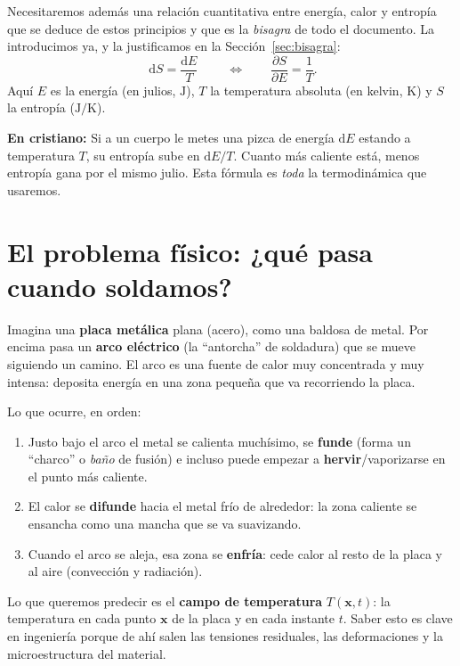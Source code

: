 \documentclass[11pt]{article}
\newcommand{\dd}{\mathrm{d}}
\theoremstyle{definition}
\theoremstyle{plain}
\newcommand{\dummies}[1]{%
  \par\smallskip\noindent
  \colorbox{yellow!18}{\parbox{\dimexpr\linewidth-2\fboxsep}{%
  \small\textbf{En cristiano:} #1}}\par\smallskip}
\begin{document}
Necesitaremos además una relación cuantitativa entre energía, calor y entropía que
se deduce de estos principios y que es la \emph{bisagra} de todo el documento. La
introducimos ya, y la justificamos en la Sección~\ref{sec:bisagra}:
\begin{equation}
  \boxed{\;\dd S = \frac{\dd E}{T}\;}
  \qquad\Longleftrightarrow\qquad
  \frac{\partial S}{\partial E} = \frac{1}{T}.
  \label{eq:bisagra}
\end{equation}
Aquí $E$ es la energía (en julios, $\mathrm{J}$), $T$ la temperatura absoluta (en
kelvin, $\mathrm{K}$) y $S$ la entropía ($\mathrm{J/K}$).

\dummies{Si a un cuerpo le metes una pizca de energía $\dd E$ estando a temperatura
$T$, su entropía sube en $\dd E/T$. Cuanto más caliente está, menos entropía gana
por el mismo julio. Esta fórmula es \emph{toda} la termodinámica que usaremos.}

\section{El problema físico: ¿qué pasa cuando soldamos?}
\label{sec:soldadura}

Imagina una \textbf{placa metálica} plana (acero), como una baldosa de metal.
Por encima pasa un \textbf{arco eléctrico} (la ``antorcha'' de soldadura) que se
mueve siguiendo un camino. El arco es una fuente de calor muy concentrada y muy
intensa: deposita energía en una zona pequeña que va recorriendo la placa.

Lo que ocurre, en orden:
\begin{enumerate}[leftmargin=1.5em]
  \item Justo bajo el arco el metal se calienta muchísimo, se \textbf{funde}
  (forma un ``charco'' o \emph{baño} de fusión) e incluso puede empezar a
  \textbf{hervir}/vaporizarse en el punto más caliente.
  \item El calor se \textbf{difunde} hacia el metal frío de alrededor: la zona
  caliente se ensancha como una mancha que se va suavizando.
  \item Cuando el arco se aleja, esa zona se \textbf{enfría}: cede calor al resto
  de la placa y al aire (convección y radiación).
\end{enumerate}

Lo que queremos predecir es el \textbf{campo de temperatura} $T(\bm x,t)$: la
temperatura en cada punto $\bm x$ de la placa y en cada instante $t$. Saber esto es
clave en ingeniería porque de ahí salen las tensiones residuales, las deformaciones
y la microestructura del material.
\end{document}
